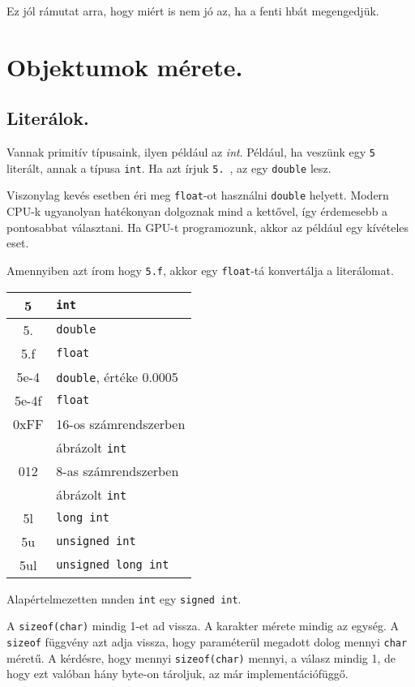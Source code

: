 \documentclass[a4paper,11.5pt]{article}
\begin{document}
	\medskip
	Ez jól rámutat arra, hogy miért is nem jó az, ha a fenti hbát megengedjük.
	\section{Objektumok mérete.}
	\subsection{Literálok.}
	Vannak primitív típusaink, ilyen például az \textit{int}. Például, ha veszünk egy \texttt{5} literált, annak a típusa \texttt{int}. Ha azt írjuk \texttt{5.}\ , az egy \texttt{double} lesz.
	\begin{note}
		Viszonylag kevés esetben éri meg \texttt{float}-ot használni \texttt{double} helyett. Modern CPU-k ugyanolyan hatékonyan dolgoznak mind a kettővel, így érdemesebb a pontosabbat választani. Ha GPU-t programozunk, akkor az például egy kívételes eset.
		
		Amennyiben azt írom hogy \texttt{5.f}, akkor egy \texttt{float}-tá konvertálja a literálomat.
		\begin{center}
			
		\begin{tabular}{c|l}
			5&\texttt{int}\\
			\hline
			5.&\texttt{double}\\
			\hline
			5.f&\texttt{float}\\
			\hline
			5e-4&\texttt{double}, értéke 0.0005\\
			\hline
			5e-4f&\texttt{float}\\
			\hline
			0xFF&{16-os számrendszerben}\\
			& ábrázolt \texttt{int}\\
			\hline
			012&{8-as számrendszerben}\\
			&ábrázolt \texttt{int}\\
			\hline
			5l&\texttt{long int}\\
			\hline
			5u&\texttt{unsigned int}\\
			\hline
			5ul&\texttt{unsigned long int}\\
		\end{tabular}
		\end{center}
	\end{note}
	\begin{note}
		Alapértelmezetten mnden \texttt{int} egy \texttt{signed int}.
	\end{note}
	A \texttt{sizeof(char)} mindig 1-et ad vissza. A karakter mérete mindig az egység. A \texttt{sizeof} függvény azt adja vissza, hogy paraméterül megadott dolog mennyi \texttt{char} méretű. A kérdésre, hogy mennyi \texttt{sizeof(char)} mennyi, a válasz mindig 1, de hogy ezt valóban hány byte-on tároljuk, az már implementációfüggő.
	\medskip
	
\end{document}
